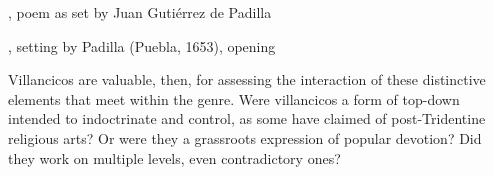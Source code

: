 \begin{poemexample}
\caption{, poem as set by Juan Gutiérrez de Padilla}
\label{poem:A_la_jacara_jacarilla}
\end{poemexample}

\begin{musicexample}
\caption{, setting by Padilla (Puebla, 1653), opening}
\label{mus:Padilla-A_la_jacara_jacarilla}
\end{musicexample}

Villancicos are valuable, then, for assessing the interaction of these distinctive elements that meet within the genre.
Were villancicos a form of top-down  intended to indoctrinate and control, as some have claimed of post-Tridentine religious arts?
Or were they a grassroots expression of popular devotion? 
Did they work on multiple levels, even contradictory ones?


